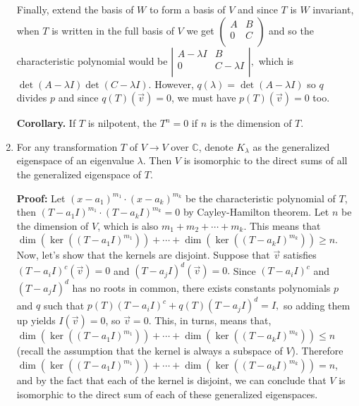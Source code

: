\documentclass[11pt]{article}
\newcommand{\bbC}{\mathbb C}
\begin{document}
\begin{enumerate}
Finally, extend the basis of $W$ to form a basis of $V$ and since $T$ is $W$ invariant, when $T$ is written in the full basis of $V$ we get 
$
\left(
\begin{array}{cc}
A & B\\
0 & C\\
\end{array}
\right)
$
and so the characteristic polynomial would be 
$
\left |
\begin{array}{cc}
A-\lambda I & B\\
0 & C -\lambda I\\
\end{array}
\right |,
$
which is 
$\det(A-\lambda I)\det(C-\lambda I)$. 
However, $q(\lambda)=\det(A-\lambda I)$ so $q$ divides $p$ and since $q(T)(\vec{v})=0$, we must have 
$p(T)(\vec{v})=0$ too. 

\textbf{Corollary.} If $T$ is nilpotent, the $T^n=0$ if $n$ is the dimension of $T$. 

\item For any transformation $T$ of $V\to V$ over $\bbC$, denote $K_\lambda$ as the generalized eigenspace of an eigenvalue $\lambda$. 
Then $V$ is isomorphic to the direct sums of all the generalized eigenspace of $T$. 

\textbf{Proof:} 
Let $(x-a_1)^{m_1}\cdot(x-a_k)^{m_k}$ be the characteristic polynomial of $T$, then 
$(T-a_1I)^{m_1}\cdot(T-a_kI)^{m_k}=0$ by Cayley-Hamilton theorem. 
Let $n$ be the dimension of $V$, which is also 
$m_1+m_2+\cdots +m_k$. 
This means that 
$\dim(\ker((T-a_1I)^{m_1}))+\cdots + \dim(\ker((T-a_kI)^{m_k}))\ge n$. 
Now, let's show that the kernels are disjoint. 
Suppose that $\vec{v}$ satisfies $(T-a_iI)^{c}(\vec{v})=0$ and $(T-a_jI)^{d}(\vec{v})=0.$ 
Since $(T-a_iI)^{c}$ and $(T-a_jI)^{d}$ has no roots in common, there exists constants polynomials $p$ and $q$ such that 
$p(T)(T-a_iI)^{c}+q(T)(T-a_jI)^{d}=I,$ so adding them up yields $I(\vec{v})=0$, so $\vec{v}=0$. 
This, in turns, means that, $\dim(\ker((T-a_1I)^{m_1}))+\cdots + \dim(\ker((T-a_kI)^{m_k}))\le n$ (recall the assumption that 
the kernel is always a subspace of $V$). 
Therefore $\dim(\ker((T-a_1I)^{m_1}))+\cdots + \dim(\ker((T-a_kI)^{m_k}))= n$, and by the fact that each of the kernel is disjoint, we can conclude that $V$ is isomorphic to the direct sum of each of these generalized eigenspaces. 

\end{enumerate}
\end{document}
